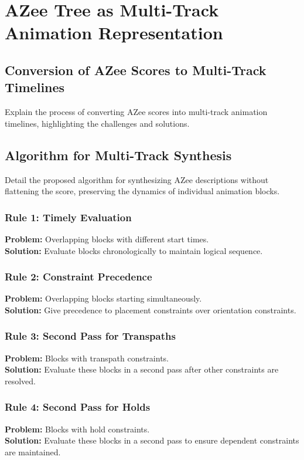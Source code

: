 \documentclass[../../main.tex]{subfiles}
\begin{document}
\section{AZee Tree as Multi-Track Animation Representation}
\subsection{Conversion of AZee Scores to Multi-Track Timelines}
Explain the process of converting AZee scores into multi-track animation timelines, highlighting the challenges and solutions.

\subsection{Algorithm for Multi-Track Synthesis}
Detail the proposed algorithm for synthesizing AZee descriptions without flattening the score, preserving the dynamics of individual animation blocks.

\subsubsection{Rule 1: Timely Evaluation}
\textbf{Problem:} Overlapping blocks with different start times.\\
\textbf{Solution:} Evaluate blocks chronologically to maintain logical sequence.

\subsubsection{Rule 2: Constraint Precedence}
\textbf{Problem:} Overlapping blocks starting simultaneously.\\
\textbf{Solution:} Give precedence to placement constraints over orientation constraints.

\subsubsection{Rule 3: Second Pass for Transpaths}
\textbf{Problem:} Blocks with transpath constraints.\\
\textbf{Solution:} Evaluate these blocks in a second pass after other constraints are resolved.

\subsubsection{Rule 4: Second Pass for Holds}
\textbf{Problem:} Blocks with hold constraints.\\
\textbf{Solution:} Evaluate these blocks in a second pass to ensure dependent constraints are maintained.
\end{document}
